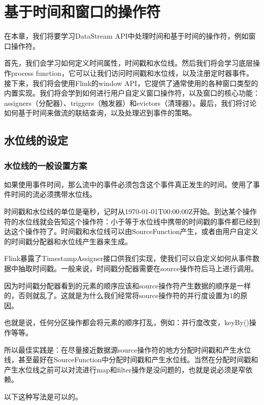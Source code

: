 \documentclass[cn,11pt,chinese]{elegantbook}
\begin{document}
\chapter{基于时间和窗口的操作符}

在本章，我们将要学习DataStream API中处理时间和基于时间的操作符，例如窗口操作符。

首先，我们会学习如何定义时间属性，时间戳和水位线。然后我们将会学习底层操作process function，它可以让我们访问时间戳和水位线，以及注册定时器事件。接下来，我们将会使用Flink的window API，它提供了通常使用的各种窗口类型的内置实现。我们将会学到如何进行用户自定义窗口操作符，以及窗口的核心功能：assigners（分配器）、triggers（触发器）和evictors（清理器）。最后，我们将讨论如何基于时间来做流的联结查询，以及处理迟到事件的策略。

\section{水位线的设定}

\subsection{水位线的一般设置方案}

如果使用事件时间，那么流中的事件必须包含这个事件真正发生的时间。使用了事件时间的流必须携带水位线。

时间戳和水位线的单位是毫秒，记时从1970-01-01T00:00:00Z开始。到达某个操作符的水位线就会告知这个操作符：小于等于水位线中携带的时间戳的事件都已经到达这个操作符了。时间戳和水位线可以由SourceFunction产生，或者由用户自定义的时间戳分配器和水位线产生器来生成。

Flink暴露了TimestampAssigner接口供我们实现，使我们可以自定义如何从事件数据中抽取时间戳。一般来说，时间戳分配器需要在source操作符后马上进行调用。

\begin{note}
    因为时间戳分配器看到的元素的顺序应该和source操作符产生数据的顺序是一样的，否则就乱了。这就是为什么我们经常将source操作符的并行度设置为1的原因。
\end{note}

也就是说，任何分区操作都会将元素的顺序打乱，例如：并行度改变，keyBy()操作等等。

所以最佳实践是：在尽量接近数据源source操作符的地方分配时间戳和产生水位线，甚至最好在SourceFunction中分配时间戳和产生水位线。当然在分配时间戳和产生水位线之前可以对流进行map和filter操作是没问题的，也就是说必须是窄依赖。

以下这种写法是可以的。
\end{document}
